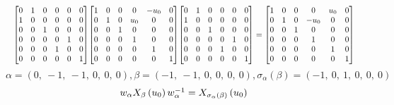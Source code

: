 \documentclass[11pt]{article}
\theoremstyle{definition}
\begin{document}
\[
\scaletoalign{\textwidth}{{\left[\begin{matrix}0 & 1 & 0 & 0 & 0 & 0\\1 & 0 & 0 & 0 & 0 & 0\\0 & 0 & 1 & 0 & 0 & 0\\0 & 0 & 0 & 0 & 1 & 0\\0 & 0 & 0 & 1 & 0 & 0\\0 & 0 & 0 & 0 & 0 & 1\end{matrix}\right]} {\left[\begin{matrix}1 & 0 & 0 & 0 & - u_{0} & 0\\0 & 1 & 0 & u_{0} & 0 & 0\\0 & 0 & 1 & 0 & 0 & 0\\0 & 0 & 0 & 1 & 0 & 0\\0 & 0 & 0 & 0 & 1 & 0\\0 & 0 & 0 & 0 & 0 & 1\end{matrix}\right]} {\left[\begin{matrix}0 & 1 & 0 & 0 & 0 & 0\\1 & 0 & 0 & 0 & 0 & 0\\0 & 0 & 1 & 0 & 0 & 0\\0 & 0 & 0 & 0 & 1 & 0\\0 & 0 & 0 & 1 & 0 & 0\\0 & 0 & 0 & 0 & 0 & 1\end{matrix}\right]} = {\left[\begin{matrix}1 & 0 & 0 & 0 & u_{0} & 0\\0 & 1 & 0 & - u_{0} & 0 & 0\\0 & 0 & 1 & 0 & 0 & 0\\0 & 0 & 0 & 1 & 0 & 0\\0 & 0 & 0 & 0 & 1 & 0\\0 & 0 & 0 & 0 & 0 & 1\end{matrix}\right]}}
\]
\[
\alpha = \left( 0, \  -1, \  -1, \  0, \  0, \  0\right), \beta = \left( -1, \  -1, \  0, \  0, \  0, \  0\right), \sigma_{\alpha}(\beta) = \left( -1, \  0, \  1, \  0, \  0, \  0\right)
\]
\[
\scaletoalign{\textwidth}{w_{\alpha} X_{\beta}\left(u_{0}\right) w_{\alpha}^{-1} = X_{\sigma_{\alpha}\left(\beta\right)}\left(u_{0}\right)}
\]
\end{document}
